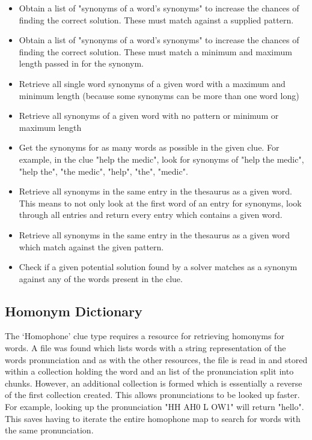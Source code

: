   \begin{itemize}
    \item Obtain a list of "synonyms of a word's synonyms" to increase the chances of
 finding the correct solution. These must match against a supplied pattern. 
    \item Obtain a list of "synonyms of a word's synonyms" to increase the chances of
 finding the correct solution. These must match a minimum and maximum length passed 
in for the synonym.
    \item Retrieve all single word synonyms of a given word with a maximum and minimum length 
(because some synonyms can be more than one word long) 
    \item Retrieve all synonyms of a given word with no pattern or minimum or maximum length
    \item Get the synonyms for as many words as possible in the given clue. For example,
 in the clue "help the medic", look for synonyms of "help the medic", "help the", "the medic", "help", "the", "medic".
    \item Retrieve all synonyms in the same entry in the thesaurus as a given word. This means to not 
 only look at the first word of an entry for synonyms, look through all entries and return every entry which
 contains a given word.
    \item Retrieve all synonyms in the same entry in the thesaurus as a given word which match against the given pattern.
    \item Check if a given potential solution found by a solver matches as a synonym against
 any of the words present in the clue.
  \end{itemize}

\subsection{Homonym Dictionary}

The `Homophone' clue type requires a resource for retrieving homonyms for words. 
A file was found which lists words with a string representation of the words pronunciation 
and as with the other resources, the file is read in and stored within a collection holding 
the word and an list of the pronunciation split into chunks. However, an additional collection 
is formed which is essentially a reverse of the first collection created. This allows pronunciations
 to be looked up faster. For example, looking up the pronunciation "HH AH0 L OW1" will return
 "hello". This saves having to iterate the entire homophone map to search for words with the
same pronunciation.

